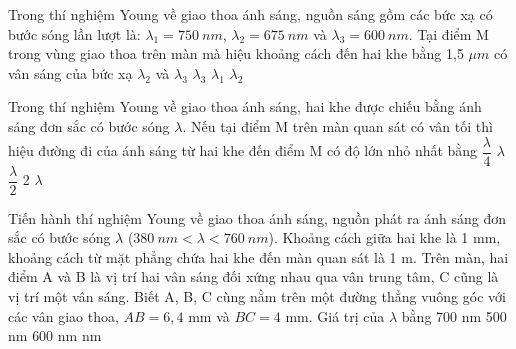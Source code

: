  
\begin{ex}%
Trong thí nghiệm Young về giao thoa ánh sáng, nguồn sáng gồm các bức xạ có bước sóng lần lượt là: ${{\lambda}_{1}}=750\ nm $, ${{\lambda}_{2}}=675\ nm $ và ${{\lambda}_{3}}=600\ nm $. Tại điểm M trong vùng giao thoa trên màn mà hiệu khoảng cách đến hai khe bằng 1,5 $\mu m $ có vân sáng của bức xạ
\choice
{${{\lambda}_{2}} $ và ${{\lambda}_{3}} $}
{${{\lambda}_{3}} $}
{\True ${{\lambda}_{1}} $}
{${{\lambda}_{2}} $}
\end{ex} 
\begin{ex}%
Trong thí nghiệm Young về giao thoa ánh sáng, hai khe được chiếu bằng ánh sáng đơn sắc có bước sóng $\lambda $. Nếu tại điểm M trên màn quan sát có vân tối thì hiệu đường đi của ánh sáng từ hai khe đến điểm M có độ lớn nhỏ nhất bằng
\choice
{$\dfrac{\lambda}{4} $}
{$\lambda $}
{\True $\dfrac{\lambda}{2} $}
{2 $\lambda $}
\end{ex} 
\begin{ex} %
 Tiến hành thí nghiệm Young về giao thoa ánh sáng, nguồn phát ra ánh sáng đơn sắc có bước sóng $\lambda $ ($380\ nm<\lambda <760\ nm$). Khoảng cách giữa hai khe là 1 mm, khoảng cách từ mặt phẳng chứa hai khe đến màn quan sát là 1 m. Trên màn, hai điểm A và B là vị trí hai vân sáng đối xứng nhau qua vân trung tâm, C cũng là vị trí một vân sáng. Biết A, B, C cùng nằm trên một đường thẳng vuông góc với các vân giao thoa, $AB=6,4$ mm và $BC=4$ mm. Giá trị của $\lambda $ bằng
\choice
{700 nm}
{500 nm}
{600 nm}
{ nm}
\end{ex} 

